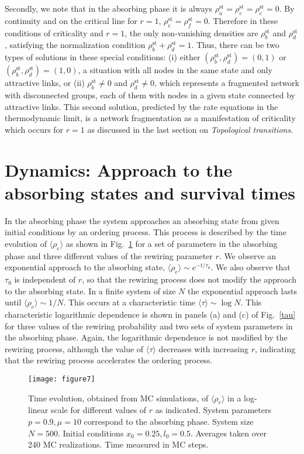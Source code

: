 \documentclass[aps,pre,notitlepage]{revtex4-1}
\begin{document}
Secondly, we note that in the absorbing phase it is always $\rho_a^\text{st}=\rho_e^\text{st}=\rho_c^\text{st}=0$. By continuity and on the critical line for $r=1$, $\rho_e^\text{st}=\rho_f^\text{st}=0$. Therefore in these conditions of criticality and $r=1$, the only non-vanishing densities are $\rho_b^\text{st}$ and $\rho_d^\text{st}$, satisfying the normalization condition $\rho_b^\text{st}+\rho_d^\text{st}=1$. Thus, there can be two types of solutions in these special conditions: (i) either $(\rho_b^\text{st},\rho_d^\text{st})=(0,1)$ or $(\rho_b^\text{st},\rho_d^\text{st})=(1,0)$, a situation with all nodes in the same state and only attractive links, or (ii) $\rho_b^\text{st}\ne0$ and $\rho_d^\text{st}\ne0$, which represents a fragmented network with disconnected groups, each of them with nodes in a given state connected by attractive links. This second solution, predicted by the rate equations in the thermodynamic limit, is a network fragmentation as a manifestation of criticality which occurs for $r=1$ as discussed in the last section on \textit{Topological transitions}.



\section*{Dynamics: Approach to the absorbing states and survival times}

In the absorbing phase the system approaches an absorbing state from given initial conditions by an ordering process. This process is described by the time evolution of $\langle\rho_{e}\rangle$ as shown in Fig.~\ref{rho_e_t} for a set of parameters in the absorbing phase and three different values of the rewiring parameter $r$. We observe an exponential approach to the absorbing state, $\langle\rho_{e}\rangle \sim e^{-t/\tau_{0}}$. We also observe that $\tau_{0}$ is independent of $r$, so that the rewiring process does not modify the approach to the absorbing state. In a finite system of size $N$ the exponential approach lasts until $\langle\rho_{e}\rangle \sim 1/N$. This occurs at a characteristic time $\langle\tau\rangle \sim \log N$. This characteristic logarithmic dependence is shown in panels (a) and (c) of Fig.~\ref{tau} for three values of the rewiring probability and two sets of system parameters in the absorbing phase. Again, the logarithmic dependence is not modified by the rewiring process, although the value of $\langle \tau\rangle$ decreases with increasing $r$, indicating that the rewiring process accelerates the ordering process.
\begin{figure}[]
\centering
 \texttt{[image: figure7]}
\caption{Time evolution, obtained from MC simulations, of $\langle\rho_{e}\rangle$ in a log-linear scale for different values of $r$ as indicated. System parameters $p=0.9, \mu=10$ correspond to the absorbing phase. System size $N=500$. Initial conditions $x_0=0.25,l_0=0.5$. Averages taken over 240 MC realizations. Time measured in MC steps.}
\label{rho_e_t}
\end{figure}
\end{document}

